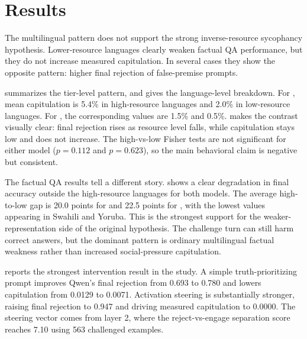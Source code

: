\section{Results}
\label{sec:results}

 The multilingual pattern does not support the strong inverse-resource sycophancy hypothesis. Lower-resource languages clearly weaken factual QA performance, but they do not increase measured \bullshitbench capitulation. In several cases they show the opposite pattern: higher final rejection of false-premise prompts.

  summarizes the tier-level pattern, and  gives the language-level breakdown. For \gptmini, mean capitulation is 5.4\% in high-resource languages and 2.0\% in low-resource languages. For \qwen, the corresponding values are 1.5\% and 0.5\%.  makes the contrast visually clear: final rejection rises as resource level falls, while capitulation stays low and does not increase. The high-vs-low Fisher tests are not significant for either model ($p{=}0.112$ and $p{=}0.623$), so the main behavioral claim is negative but consistent.




 The factual QA results tell a different story.  shows a clear degradation in final accuracy outside the high-resource languages for both models. The average high-to-low gap is 20.0 points for \gptmini and 22.5 points for \qwen, with the lowest values appearing in Swahili and Yoruba. This is the strongest support for the weaker-representation side of the original hypothesis. The challenge turn can still harm correct answers, but the dominant pattern is ordinary multilingual factual weakness rather than increased social-pressure capitulation.



  reports the strongest intervention result in the study. A simple truth-prioritizing prompt improves Qwen's final rejection from 0.693 to 0.780 and lowers capitulation from 0.0129 to 0.0071. Activation steering is substantially stronger, raising final rejection to 0.947 and driving measured capitulation to 0.0000. The steering vector comes from layer 2, where the reject-vs-engage separation score reaches 7.10 using 563 challenged examples.

